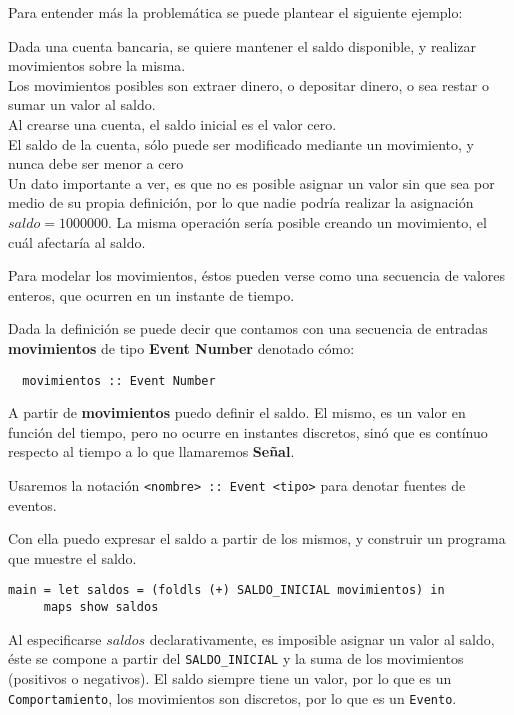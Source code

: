 
Para entender más la problemática se puede plantear el siguiente ejemplo:

\begin{center}
  Dada una cuenta bancaria, se quiere mantener el saldo disponible,
y realizar movimientos sobre la misma.\\

  Los movimientos posibles son extraer dinero, o depositar dinero,
o sea restar o sumar un valor al saldo.\\

  Al crearse una cuenta, el saldo inicial es el valor cero.\\

  El saldo de la cuenta, sólo puede ser modificado mediante un movimiento,
  y nunca debe ser menor a cero\\

  Un dato importante a ver, es que no es posible asignar un valor
sin que sea por medio de su propia definición, por lo que nadie
podría realizar la asignación $saldo = 1000000$.
  La misma operación sería posible creando un movimiento, el cuál
afectaría al saldo.
\end{center}

  Para modelar los movimientos, éstos pueden verse como una
secuencia de valores enteros, que ocurren en un instante de tiempo.

  Dada la definición se puede decir que contamos con una secuencia de
entradas \textbf{movimientos} de tipo \textbf{Event Number} denotado cómo:

\begin{verbatim}
  movimientos :: Event Number
\end{verbatim}

  A partir de \textbf{movimientos} puedo definir el saldo.
El mismo, es un valor en función del tiempo, pero no ocurre en
instantes discretos, sinó que es contínuo respecto al tiempo a lo
que llamaremos \textbf{Señal}.

Usaremos la notación \texttt{<nombre> :: Event <tipo>} para denotar
fuentes de eventos.

  Con ella puedo expresar el saldo a partir de los mismos, y construir
un programa que muestre el saldo.

\begin{verbatim}
main = let saldos = (foldls (+) SALDO_INICIAL movimientos) in
     maps show saldos
\end{verbatim}

  Al especificarse $saldos$ declarativamente, es imposible asignar un valor al saldo,
éste se compone a partir del \texttt{SALDO\_INICIAL} y la suma de
los movimientos (positivos o negativos).
  El saldo siempre tiene un valor, por lo que es un \texttt{Comportamiento}, los movimientos
son discretos, por lo que es un \texttt{Evento}.


